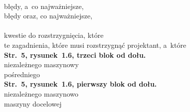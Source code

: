 \documentclass[a4paper,11pt]{article}
\numberwithin{equation}{section}
\begin{document}
\noindent
{} \\
\Jest błędy, a~co najważniejsze, \\
\PowinnoByc błędy oraz, co najważniejsze, \\
 \\
\Jest kwestie do rozstrzygnięcia, które \\
\PowinnoByc te zagadnienia, które musi rozstrzygnąć projektant, a~które \\
\textbf{Str.~5, rysunek~1.6, trzeci blok od dołu.} \\
\Jest niezależnego maszynowy \\
\PowinnoByc pośredniego \\
\textbf{Str.~5, rysunek~1.6, pierwszy blok od dołu.} \\
\Jest niezależnego maszynowo \\
\PowinnoByc maszyny docelowej \\












\printbibliography





\end{document}
